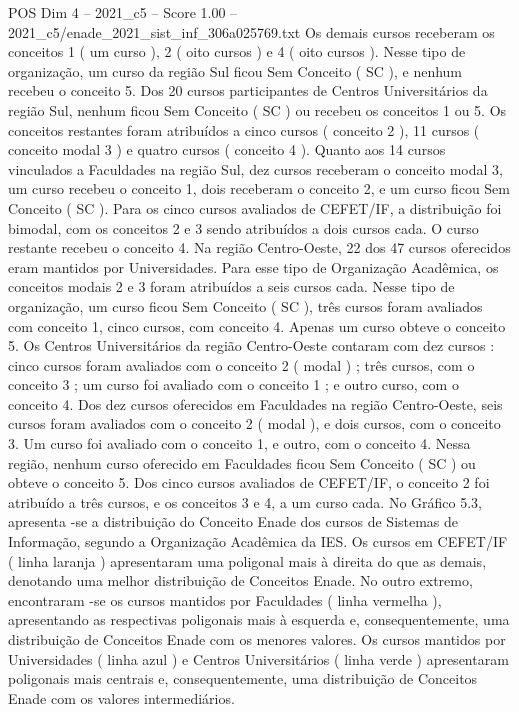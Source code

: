 \begin{textsample}{POS Dim 4 – 2021\_c5 – Score 1.00 – 2021\_c5/enade\_2021\_sist\_inf\_306a025769.txt}
Os demais cursos receberam os conceitos 1 ( um curso ), 2 ( oito cursos ) e 4 ( oito cursos ).
Nesse tipo de organização, um curso da região Sul ficou Sem Conceito ( SC ), e nenhum recebeu o conceito 5.
Dos 20 cursos participantes de Centros Universitários da região Sul, nenhum ficou Sem Conceito ( SC ) ou recebeu os conceitos 1 ou 5.
Os conceitos restantes foram atribuídos a cinco cursos ( conceito 2 ), 11 cursos ( conceito modal 3 ) e quatro cursos ( conceito 4 ).
Quanto aos 14 cursos vinculados a Faculdades na região Sul, dez cursos receberam o conceito modal 3, um curso recebeu o conceito 1, dois receberam o conceito 2, e um curso ficou Sem Conceito ( SC ).
Para os cinco cursos avaliados de CEFET/IF, a distribuição foi bimodal, com os conceitos 2 e 3 sendo atribuídos a dois cursos cada.
O curso restante recebeu o conceito 4.
Na região Centro-Oeste, 22 dos 47 cursos oferecidos eram mantidos por Universidades.
Para esse tipo de Organização Acadêmica, os conceitos modais 2 e 3 foram atribuídos a seis cursos cada.
Nesse tipo de organização, um curso ficou Sem Conceito ( SC ), três cursos foram avaliados com conceito 1, cinco cursos, com conceito 4.
Apenas um curso obteve o conceito 5.
Os Centros Universitários da região Centro-Oeste contaram com dez cursos : cinco cursos foram avaliados com o conceito 2 ( modal ) ; três cursos, com o conceito 3 ; um curso foi avaliado com o conceito 1 ; e outro curso, com o conceito 4.
Dos dez cursos oferecidos em Faculdades na região Centro-Oeste, seis cursos foram avaliados com o conceito 2 ( modal ), e dois cursos, com o conceito 3.
Um curso foi avaliado com o conceito 1, e outro, com o conceito 4.
Nessa região, nenhum curso oferecido em Faculdades ficou Sem Conceito ( SC ) ou obteve o conceito 5.
Dos cinco cursos avaliados de CEFET/IF, o conceito 2 foi atribuído a três cursos, e os conceitos 3 e 4, a um curso cada.
No Gráfico 5.3, apresenta -se a distribuição do Conceito Enade dos cursos de Sistemas de Informação, segundo a Organização Acadêmica da IES.
Os cursos em CEFET/IF ( linha laranja ) apresentaram uma poligonal mais à direita do que as demais, denotando uma melhor distribuição de Conceitos Enade.
No outro extremo, encontraram -se os cursos mantidos por Faculdades ( linha vermelha ), apresentando as respectivas poligonais mais à esquerda e, consequentemente, uma distribuição de Conceitos Enade com os menores valores.
Os cursos mantidos por Universidades ( linha azul ) e Centros Universitários ( linha verde ) apresentaram poligonais mais centrais e, consequentemente, uma distribuição de Conceitos Enade com os valores intermediários.

\end{textsample}

